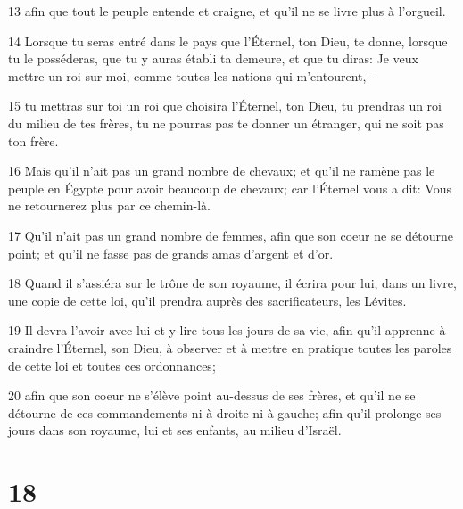 \par 13 afin que tout le peuple entende et craigne, et qu'il ne se livre plus à l'orgueil.
\par 14 Lorsque tu seras entré dans le pays que l'Éternel, ton Dieu, te donne, lorsque tu le posséderas, que tu y auras établi ta demeure, et que tu diras: Je veux mettre un roi sur moi, comme toutes les nations qui m'entourent, -
\par 15 tu mettras sur toi un roi que choisira l'Éternel, ton Dieu, tu prendras un roi du milieu de tes frères, tu ne pourras pas te donner un étranger, qui ne soit pas ton frère.
\par 16 Mais qu'il n'ait pas un grand nombre de chevaux; et qu'il ne ramène pas le peuple en Égypte pour avoir beaucoup de chevaux; car l'Éternel vous a dit: Vous ne retournerez plus par ce chemin-là.
\par 17 Qu'il n'ait pas un grand nombre de femmes, afin que son coeur ne se détourne point; et qu'il ne fasse pas de grands amas d'argent et d'or.
\par 18 Quand il s'assiéra sur le trône de son royaume, il écrira pour lui, dans un livre, une copie de cette loi, qu'il prendra auprès des sacrificateurs, les Lévites.
\par 19 Il devra l'avoir avec lui et y lire tous les jours de sa vie, afin qu'il apprenne à craindre l'Éternel, son Dieu, à observer et à mettre en pratique toutes les paroles de cette loi et toutes ces ordonnances;
\par 20 afin que son coeur ne s'élève point au-dessus de ses frères, et qu'il ne se détourne de ces commandements ni à droite ni à gauche; afin qu'il prolonge ses jours dans son royaume, lui et ses enfants, au milieu d'Israël.

\chapter{18}

